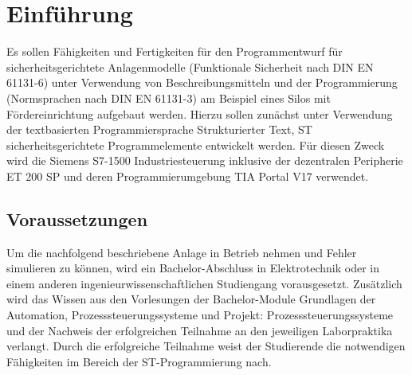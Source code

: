 \section{Einführung}

Es sollen Fähigkeiten und Fertigkeiten für den Programmentwurf für sicherheitsgerichtete Anlagenmodelle (Funktionale Sicherheit nach DIN EN 61131-6) unter Verwendung von Beschreibungsmitteln und der Programmierung (Normsprachen nach DIN EN 61131-3) am Beispiel eines Silos mit Fördereinrichtung aufgebaut werden. Hierzu sollen zunächst unter Verwendung der textbasierten Programmiersprache \glqq Strukturierter Text, ST\grqq{} sicherheitsgerichtete Programmelemente entwickelt werden. Für diesen Zweck wird die Siemens S7-1500 Industriesteuerung inklusive der dezentralen Peripherie ET 200 SP und deren Programmierumgebung TIA Portal V17 verwendet.

\subsection{Voraussetzungen}

Um die nachfolgend beschriebene Anlage in Betrieb nehmen und Fehler simulieren zu können, wird ein Bachelor-Abschluss in Elektrotechnik oder in einem anderen ingenieurwissenschaftlichen Studiengang vorausgesetzt. Zusätzlich wird das Wissen aus den Vorlesungen der Bachelor-Module \glqq Grundlagen der Automation\grqq{}, \glqq Prozesssteuerungssysteme\grqq{} und \glqq Projekt: Prozesssteuerungssysteme\grqq{} und der Nachweis der erfolgreichen Teilnahme an den jeweiligen Laborpraktika verlangt. Durch die erfolgreiche Teilnahme weist der Studierende die notwendigen Fähigkeiten im Bereich der ST-Programmierung nach.